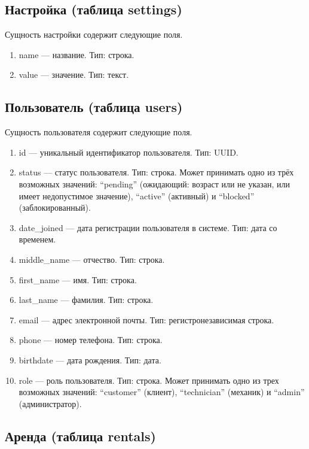 \subsection{Настройка (таблица settings)}

Сущность настройки содержит следующие поля.

\begin{enumerate}
	\item name --- название. Тип: строка.
	\item value --- значение. Тип: текст.
\end{enumerate}

\subsection{Пользователь (таблица users)}

Сущность пользователя содержит следующие поля.

\begin{enumerate}
	\item id --- уникальный идентификатор пользователя. Тип: UUID.
	\item status --- статус пользователя. Тип: строка. Может принимать одно из трёх
	      возможных значений: \enquote{pending} (ожидающий: возраст или не указан, или
	      имеет недопустимое значение), \enquote{active} (активный) и \enquote{blocked}
	      (заблокированный).
	\item date\_joined --- дата регистрации пользователя в системе. Тип: дата со
	      временем.
	\item middle\_name --- отчество. Тип: строка.
	\item first\_name --- имя. Тип: строка.
	\item last\_name --- фамилия. Тип: строка.
	\item email --- адрес электронной почты. Тип: регистронезависимая строка.
	\item phone --- номер телефона. Тип: строка.
	\item birthdate --- дата рождения. Тип: дата.
	\item role --- роль пользователя. Тип: строка. Может принимать одно из трех возможных
	      значений: \enquote{customer} (клиент), \enquote{technician} (механик) и
	      \enquote{admin} (администратор).
\end{enumerate}

\subsection{Аренда (таблица rentals)}

